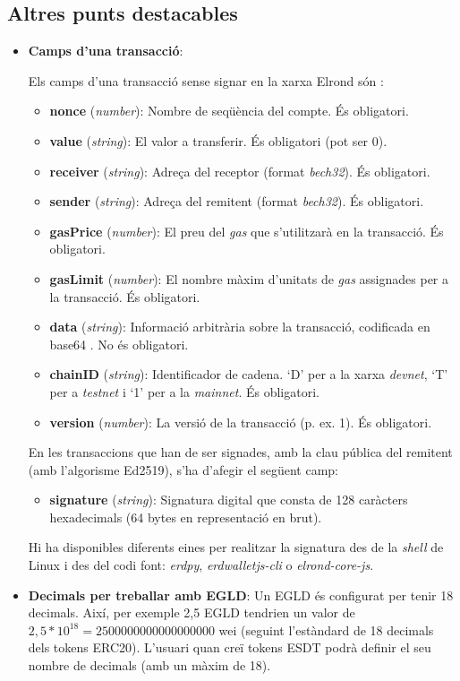 \documentclass[11pt,a4paper]{article}
\begin{document}
\subsection{Altres punts destacables}\label{sub:altres}
\begin{itemize}
\item \textbf{Camps d'una transacció}:

Els camps d'una transacció sense signar en la xarxa Elrond són \cite{elrond2022}:
\begin{itemize}
\item \textbf{nonce} (\textit{number}): Nombre de seqüència del compte. És obligatori.
\item \textbf{value}	(\textit{string}): El valor a transferir. És obligatori (pot ser 0).
\item \textbf{receiver} (\textit{string}): Adreça del receptor (format \textit{bech32}). És obligatori.
\item \textbf{sender} (\textit{string}): Adreça del remitent (format \textit{bech32}). És obligatori.
\item \textbf{gasPrice} (\textit{number}): El preu del \textit{gas} que s'utilitzarà en la transacció. És obligatori.
\item \textbf{gasLimit} (\textit{number}): El nombre màxim d'unitats de \textit{gas} assignades per a la transacció. És obligatori.
\item \textbf{data} (\textit{string}): Informació arbitrària sobre la transacció, codificada en base64 . No és obligatori.
\item \textbf{chainID} (\textit{string}): Identificador de cadena. `D' per a la xarxa \textit{devnet}, `T' per a \textit{testnet} i `1' per a la \textit{mainnet}. És obligatori.
\item \textbf{version} (\textit{number}): La versió de la transacció (p. ex. 1). És obligatori.
\end{itemize}
En les transaccions que han de ser signades, amb la clau pública del remitent (amb l'algorisme Ed2519), s'ha d'afegir el següent camp: 
\begin{itemize}
\item \textbf{signature} (\textit{string}): Signatura digital que consta de 128 caràcters hexadecimals (64 bytes en representació en brut).
\end{itemize}
Hi ha disponibles diferents eines per realitzar la signatura des de la \textit{shell} de Linux i des del codi font: \textit{erdpy}, \textit{erdwalletjs-cli} o \textit{elrond-core-js}.
\item \textbf{Decimals per treballar amb EGLD}: Un EGLD és configurat per tenir 18 decimals. Així, per exemple 2,5 EGLD tendrien un valor de \(2,5 * 10^{18} = 2500000000000000000\) wei (seguint l'estàndard de 18 decimals dels tokens ERC20). L'usuari quan creï tokens ESDT podrà definir el seu nombre de decimals (amb un màxim de 18).

\end{itemize}
\end{document}

